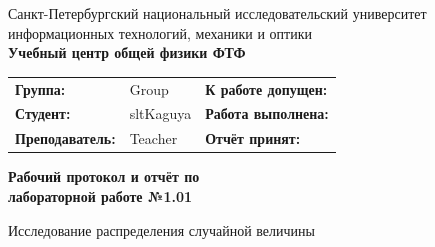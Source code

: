 \documentclass[12pt]{article}
\begin{document}
\begin{center}
    \hfill \break
    \hfill \break
    Санкт-Петербургский национальный исследовательский университет \\
    информационных технологий, механики и оптики \\
    \textbf{Учебный центр общей физики ФТФ} \\
    \vspace{12pt}
    \begin{tabular}[l]{m{} m{} m{}}
        \hline
        \textbf{Группа:} & Group & \textbf{К работе допущен:} \\
        \textbf{Студент:} & sltKaguya & \textbf{Работа выполнена:} \\
        \textbf{Преподаватель:} & Teacher & \textbf{Отчёт принят:}
    \end{tabular} \break
    \hfill \break
    \Large{\textbf{Рабочий протокол и отчёт по \\
    лабораторной работе №1.01}} \break
    
    \large{Исследование распределения случайной величины\\}\hfill
\end{center}
\end{document}
